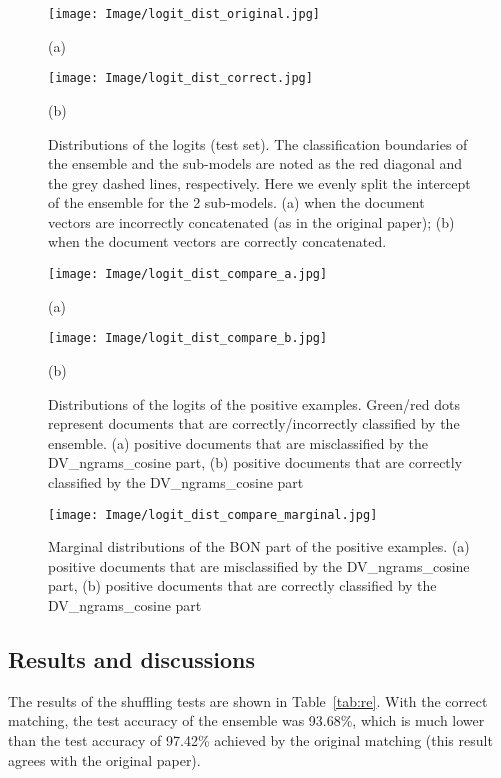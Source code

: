 \documentclass[11pt]{article}
\begin{document}
\begin{figure}[t]
    \centering \texttt{[image: Image/logit\_dist\_original.jpg]}
    
    (a)
    
    \texttt{[image: Image/logit\_dist\_correct.jpg]}
    
    (b)
    
    \caption{Distributions of the logits (test set). The classification boundaries of the ensemble and the sub-models are noted as the red diagonal and the grey dashed lines, respectively. Here we evenly split the intercept of the ensemble for the 2 sub-models. (a) when the document vectors are incorrectly concatenated (as in the original paper); (b) when the document vectors are correctly concatenated.}
    \label{fig:logit_dist}
\end{figure}

\begin{figure}[h]
    \centering \texttt{[image: Image/logit\_dist\_compare\_a.jpg]}
    
    (a)
    
    \texttt{[image: Image/logit\_dist\_compare\_b.jpg]}
    
    (b)
    
    \caption{Distributions of the logits of the positive examples. Green/red dots represent documents that are correctly/incorrectly classified by the ensemble. (a) positive documents that are misclassified by the DV\_ngrams\_cosine part, (b) positive documents that are correctly classified by the DV\_ngrams\_cosine part}
    \label{fig:logit_dist_zoom}
\end{figure}

\begin{figure}[h]
    \centering \texttt{[image: Image/logit\_dist\_compare\_marginal.jpg]}
    \caption{Marginal distributions of the BON part of the positive examples. (a) positive documents that are misclassified by the DV\_ngrams\_cosine part, (b) positive documents that are correctly classified by the DV\_ngrams\_cosine part}
    \label{fig:logit_dist_marg}
\end{figure}

\subsection{Results and discussions}
The results of the shuffling tests are shown in Table~\ref{tab:re}. With the correct matching, the test accuracy of the ensemble was 93.68\%, which is much lower than the test accuracy of 97.42\% achieved by the original matching (this result agrees with the original paper).
\end{document}
